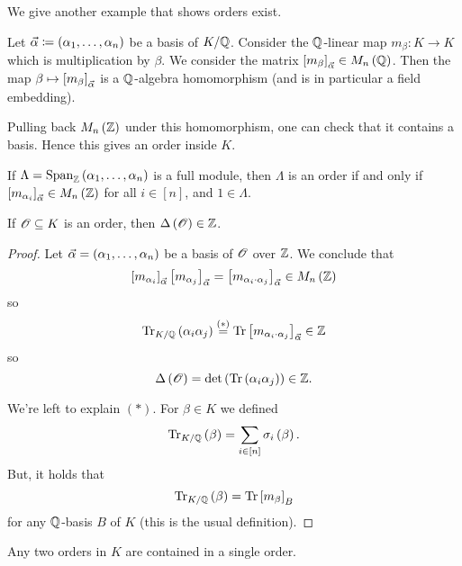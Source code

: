 \documentclass[11pt]{article}
\begin{document}
We give another example that shows orders exist.

\begin{example}
Let $\vec{\alpha} \coloneqq \left( \alpha_1, \ldots, \alpha_n \right)$ be a basis of $K/\mathbb{Q}$. Consider the $\mathbb{Q}$-linear map $m_\beta \colon K \to K$ which is multiplication by $\beta$. We consider the matrix $\left[ m_\beta \right]_{\vec{\alpha}} \in M_n\left( \mathbb{Q} \right)$. Then the map $\beta \mapsto \left[ m_{\beta} \right]_{\vec{\alpha}}$ is a $\mathbb{Q}$-algebra homomorphism (and is in particular a field embedding).

Pulling back $M_n\left( \mathbb{Z} \right)$ under this homomorphism, one can check that it contains a basis. Hence this gives an order inside $K$. 
\end{example}

\begin{remark}
If $\Lambda = \operatorname{Span}_{\mathbb{Z}}\left( \alpha_1, \ldots, \alpha_n \right)$ is a full module, then $\Lambda$ is an order if and only if $\left[ m_{\alpha_i} \right]_{\vec{\alpha}} \in M_n\left( \mathbb{Z} \right)$ for all $i \in [n]$, and $1 \in \Lambda$.
\end{remark}

\begin{proposition}
If $\mathcal{O} \subseteq K$ is an order, then $\Delta\left( \mathcal{O} \right) \in \mathbb{Z}$.
\end{proposition}

\begin{proof}
Let $\vec{\alpha} = \left( \alpha_1, \ldots, \alpha_n \right)$ be a basis of $\mathcal{O}$ over $\mathbb{Z}$. 
We conclude that
\[\left[ m_{\alpha_i} \right]_{\vec{\alpha}} \left[ m_{\alpha_j} \right]_{\vec{\alpha}} = \left[ m_{\alpha_i \cdot \alpha_j} \right]_{\vec{\alpha}} \in M_n\left( \mathbb{Z} \right)\]
so
\[\mathrm{Tr}_{K/\mathbb{Q}}\left( \alpha_i \alpha_j \right) \stackrel{(*)}{=} \mathrm{Tr}\left[ m_{\alpha_i \cdot \alpha_j} \right]_{\vec{\alpha}} \in \mathbb{Z}\]
so
\[\Delta\left( \mathcal{O} \right) = \det\left( \mathrm{Tr}\left( \alpha_i \alpha_j \right) \right) \in \mathbb{Z} \text{.}\]

We're left to explain $(*)$. For $\beta \in K$ we defined
\[\mathrm{Tr}_{K/\mathbb{Q}}\left( \beta \right) = \sum_{i \in [n]} \sigma_i\left( \beta \right) \text{.}\]
But, it holds that
\[\mathrm{Tr}_{K/\mathbb{Q}}\left( \beta \right) = \mathrm{Tr}\left[ m_{\beta} \right]_{B}\]
for any $\mathbb{Q}$-basis $B$ of $K$ (this is the usual definition).
\end{proof}

\begin{proposition}
Any two orders in $K$ are contained in a single order.
\end{proposition}
\end{document}
